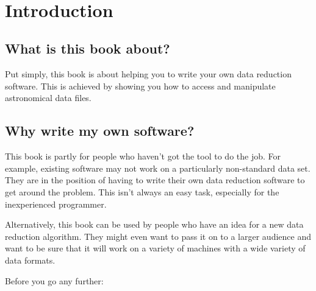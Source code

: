\stardocabstract
 \newpage
 \begin{latexonly}
   \setlength{\parskip}{0mm}
   \latexonlytoc
   \setlength{\parskip}{\medskipamount}
   \markright{\stardocname}
 \end{latexonly}
\newpage
~
\newpage
\renewcommand{\thepage}{\arabic{page}}
\setcounter{page}{1}

\section{Introduction}

\subsection{What is this book about?}

Put simply, this book is about helping you to write 
your own data reduction software. This is achieved
by showing you how to access and manipulate astronomical
data files. 

\subsection{Why write my own software?}

This book is partly for people who haven't got the tool to do the job. For
example, existing software may not work on a particularly non-standard
data set.  They are in the position of having to write their own data
reduction software to get around the problem. This isn't always an easy
task, especially for the inexperienced programmer.

Alternatively, this book can be used by people who have an idea for a new
data reduction algorithm.  They might even want to pass it on to a larger
audience and want to be sure that it will work on a variety of machines
with a wide variety of data formats. 

Before you go any further:

\begin{quote}
{}
\end{quote}

